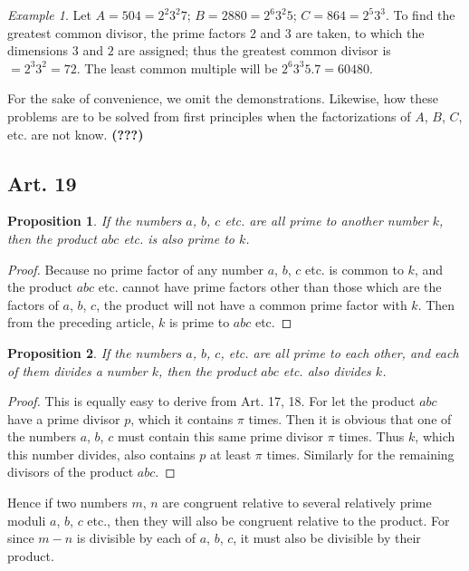 \documentclass{book}
\theoremstyle{plain}
\newtheorem{proposition}{Proposition}
\theoremstyle{remark}
\newtheorem*{example}{Example}
\begin{document}
\begin{example} Let $A = 504 = 2^2 3^2 7$; $B = 2880 = 2^6 3^2 5$; $C = 864 = 2^5 3^3$.  To find the greatest common divisor, the prime factors $2$ and $3$ are taken, to which the dimensions $3$ and $2$ are assigned; thus the greatest common divisor is $= 2^3 3^2 = 72$.  The least common multiple will be $2^6 3^3 5.7 = 60480$. \end{example}

For the sake of convenience, we omit the demonstrations.   Likewise, how these problems are to be solved from first principles when the factorizations of $A$, $B$, $C$, etc. are not know. \textbf{(???)} 


\subsection*{Art. 19}

\begin{proposition} If the numbers $a$, $b$, $c$ etc. are all prime to another number $k$, then the product $abc$ etc. is also prime to $k$. \end{proposition}
\begin{proof} Because no prime factor of any number $a$, $b$, $c$ etc. is common to $k$, and the product $abc$ etc. cannot have prime factors other than those which are the factors of $a$, $b$, $c$, the product will not have a common prime factor with $k$.  Then from the preceding article, $k$ is prime to $abc$ etc. \end{proof}

\begin{proposition} If the numbers $a$, $b$, $c$, etc. are all prime to each other, and each of them divides a number $k$, then the product $abc$ etc. also divides $k$. \end{proposition}
\begin{proof} This is equally easy to derive from Art. 17, 18.  For let the product $abc$ have a prime divisor $p$, which it contains $\pi$ times.  Then it is obvious that one of the numbers $a$, $b$, $c$ must contain this same prime divisor $\pi$ times.  Thus $k$, which this number divides, also contains $p$ at least $\pi$ times.  Similarly for the remaining divisors of the product $abc$. \end{proof}

Hence if two numbers $m$, $n$ are congruent relative to several relatively prime moduli $a$, $b$, $c$ etc., then they will also be congruent relative to the product.   For since $m-n$ is divisible by each of $a$, $b$, $c$, it must also be divisible by their product.
\end{document}
